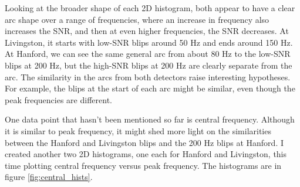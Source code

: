 \documentclass[a4paper]{article}
\begin{document}
Looking at the broader shape of each 2D histogram, both appear to have a clear arc shape over a range of frequencies, where an increase in frequency also increases the SNR, and then at even higher frequencies, the SNR decreases. At Livingston, it starts with low-SNR blips around 50 Hz and ends around 150 Hz. At Hanford, we can see the same general arc from about 80 Hz to the low-SNR blips at 200 Hz, but the high-SNR blips at 200 Hz are clearly separate from the arc. The similarity in the arcs from both detectors raise interesting hypotheses. For example, the blips at the start of each arc might be similar, even though the peak frequencies are different. 

One data point that hasn't been mentioned so far is central frequency. Although it is similar to peak frequency, it might shed more light on the similarities between the Hanford and Livingston blips and the 200 Hz blips at Hanford. I created another two 2D histograms, one each for Hanford and Livingston, this time plotting central frequency versus peak frequency. The histograms are in figure \ref{fig:central_hists}.
\end{document}
